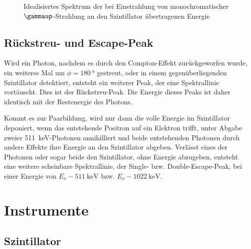 \begin{figure}[htbp]
    \centering
    \caption{%
        Idealisiertes Spektrum der bei Einstrahlung von monochromatischer
        $\gammaup$-Strahlung an den Szintillator übertragenen Energie
    }
    \label{fig:Compton}
\end{figure}

\subsection{Rückstreu- und Escape-Peak}

Wird ein Photon, nachdem es durch den Compton-Effekt zurückgeworfen wurde, ein
weiteres Mal um $\phi = \SI{180}{\degree}$ gestreut, oder in einem
gegenüberliegenden Szintillator detektiert, entsteht ein weiterer Peak, der
eine Spektrallinie vortäuscht. Dies ist der Rückstreu-Peak. Die Energie dieses
Peaks ist daher identisch mit der Restenergie des Photons.

Kommt es zur Paarbildung, wird nur dann die volle Energie im Szintillator
deponiert, wenn das entstehende Positron auf ein Elektron trifft, unter Abgabe
zweier \SI{511}{\kilo\electronvolt}-Photonen annihilliert und beide
entstehenden Photonen durch andere Effekte ihre Energie an den Szintillator
abgeben. Verlässt eines der Photonen oder sogar beide den Szintillator, ohne
Energie abzugeben, entsteht eine weitere scheinbare Spektrallinie, der Single-
bzw. Double-Escape-Peak, bei einer Energie von
$E_\nu-\SI{511}{\kilo\electronvolt}$ bzw. $E_\nu-\SI{1022}{\kilo\electronvolt}$.

\section{Instrumente}

\subsection{Szintillator}

